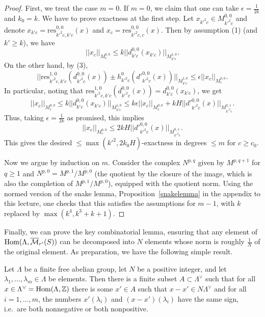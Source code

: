 \begin{proof}
  First, we treat the case $m=0$.
  If $m=0$, we claim that one can take $\epsilon=\tfrac 1{2k}$ and $k_0=k$.
  We have to prove exactness at the first step.
  Let $x_{k'^2c}\in M^{0,0}_{k'^2c}$ and
  denote $x_{k'c}=\mathrm{res}_{k'^2c,k'c}^{0,0}(x)$
  and $x_c=\mathrm{res}_{k'^2c,c}^{0,0}(x)$.
  Then by assumption (1) (and $k'\geq k$), we have
  \[
  ||x_c||_{M^{0,0}_c}\leq k||d^{0,0}_{k'c}(x_{k'c})||_{M^{1,0}_{k'c}}.
  \]
  On the other hand, by (3),
  \[
  ||\mathrm{res}_{k'^2c,k'c}^{1,0}(d^{0,0}_{k'^2c}(x))\pm h^0_{k'^2c}(d'^{0,0}_{k'^2c}(x))||_{M^{1,0}_{k'c}}\leq \epsilon ||x_c||_{M^{0,0}_c}.
  \]
  In particular, noting that $\mathrm{res}_{k'^2c,k'c}^{1,0}(d^{0,0}_{k'^2c}(x)) = d^{0,0}_{k'c}(x_{k'c})$, we get
  \[
  ||x_c||_{M^{0,0}_c}\leq k||d^{0,0}_{k'c}(x_{k'c})||_{M^{1,0}_{k'c}}\leq k\epsilon ||x_c||_{M^{0,0}_c} + kH ||d'^{0,0}_{k'^2c}(x)||_{M^{0,1}_{k'^2c}}.
  \]
  Thus, taking $\epsilon=\tfrac 1{2k}$ as promised, this implies
  \[
  ||x_c||_{M^{0,0}_c}\leq 2kH ||d'^{0,0}_{k'^2c}(x)||_{M^{0,1}_{k'^2c}}.
  \]
  This gives the desired $\leq \max(k'^2,2k_0H)$-exactness in degrees $\leq m$ for $c\geq c_0$.

  Now we argue by induction on $m$.
  Consider the complex $N^{p,q}$ given by $M^{p,q+1}$ for $q\geq 1$
  and $N^{p,0} = M^{p,1}/\overline{M^{p,0}}$
  (the quotient by the closure of the image, which is also the completion of $M^{p,1}/M^{p,0}$),
  equipped with the quotient norm.
  Using the normed version of the snake lemma,
  Proposition~\ref{snakelemma} in the appendix to this lecture,
  one checks that this satisfies the assumptions for $m-1$,
  with $k$ replaced by $\max(k^4,k^3+k+1)$.
\end{proof}

Finally, we can prove the key combinatorial lemma,
ensuring that any element of $\operatorname{Hom}(\Lambda,\overline{\mathcal M}_{r'}(S))$
can be decomposed into $N$ elements whose norm is roughly $\tfrac 1N$ of the original element.
As preparation, we have the following simple result.

\begin{lemma}
  \label{combi_aux}
  Let $\Lambda$ be a finite free abelian group,
  let $N$ be a positive integer,
  and let $\lambda_1,\ldots,\lambda_m\in \Lambda$ be elements.
  Then there is a finite subset $A\subset \Lambda^\vee$
  such that for all $x\in \Lambda^\vee=\operatorname{Hom}(\Lambda,\mathbb Z)$
  there is some $x'\in A$ such that $x-x'\in N\Lambda^\vee$
  and for all $i=1,\ldots,m$,
  the numbers $x'(\lambda_i)$ and $(x-x')(\lambda_i)$ have the same sign,
  i.e.~are both nonnegative or both nonpositive.
\end{lemma}

